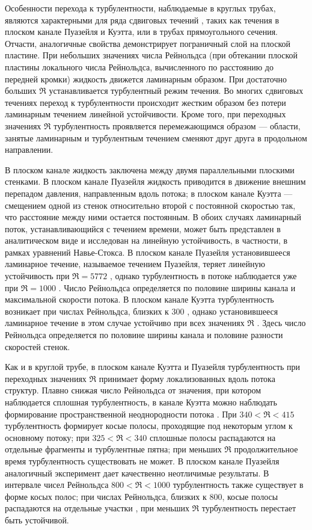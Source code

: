 Особенности перехода к турбулентности, наблюдаемые в круглых трубах, являются характерными для ряда сдвиговых течений \cite{Manneville2015, Manneville2016}, таких как течения в плоском канале Пуазейля и Куэтта, или в трубах прямоугольного сечения. Отчасти, аналогичные свойства демонстрирует пограничный слой на плоской пластине. При небольших значениях числа Рейнольдса (при обтекании плоской пластины локального числа Рейнольдса, вычисленного по расстоянию до передней кромки) жидкость движется ламинарным образом. При достаточно больших $\Re$ устанавливается турбулентный режим течения. Во многих сдвиговых течениях переход к турбулентности происходит жестким образом без потери ламинарным течением линейной устойчивости. Кроме того, при переходных значениях $\Re$ турбулентность проявляется перемежающимся образом --- области, занятые ламинарным и турбулентным течением сменяют друг друга в продольном направлении.  

В плоском канале жидкость заключена между двумя параллельными плоскими стенками. В плоском канале Пуазейля жидкость приводится в движение внешним перепадом давления, направленным вдоль потока; в плоском канале Куэтта --- смещением одной из стенок относительно второй с постоянной скоростью так, что расстояние между ними остается постоянным. В обоих случаях ламинарный поток, устанавливающийся с течением времени, может быть представлен в аналитическом виде и исследован на линейную устойчивость, в частности, в рамках уравнений Навье-Стокса. В плоском канале Пуазейля установившееся ламинарное течение, называемое течением Пуазейля, теряет линейную устойчивость при $\Re = 5772$ \cite{Orszag1971}, однако турбулентность в потоке наблюдается уже при $\Re = 1000$ \cite{Orszag1980}. Число Рейнольдса определяется по половине ширины канала и максимальной скорости потока. В плоском канале Куэтта турбулентность возникает при числах Рейнольдса, близких к $300$ \cite{Bottin1998}, однако установившееся ламинарное течение в этом случае устойчиво при всех значениях $\Re$ \cite{Romanov1973}. Здесь число Рейнольдса определяется по половине ширины канала и половине разности скоростей стенок. 

Как и в круглой трубе, в плоском канале Куэтта \cite{Prigent2002, Barkley2005} и Пуазейля турбулентность при переходных значениях $\Re$ принимает форму локализованных вдоль потока структур. Плавно снижая число Рейнольдса от значения, при котором наблюдается сплошная турбулентность, в канале Куэтта можно наблюдать формирование пространственной неоднородности потока \cite{Duguet2010Couette}. При $340 < \Re < 415$ турбулентность формирует косые полосы, проходящие под некоторым углом к основному потоку; при $325 < \Re < 340$ сплошные полосы распадаются на отдельные фрагменты и турбулентные пятна; при меньших $\Re$ продолжительное время турбулентность существовать не может. В плоском канале Пуазейля аналогичный эксперимент дает качественно неотличимые результаты. В интервале чисел Рейнольдса $800 < \Re < 1000$ турбулентность также существует в форме косых полос; при числах Рейнольдса, близких к 800, косые полосы распадаются на отдельные участки \cite{Tuckerman2014, Lernoult2014, Sano2015}, при меньших $\Re$ турбулентность перестает быть устойчивой. 

